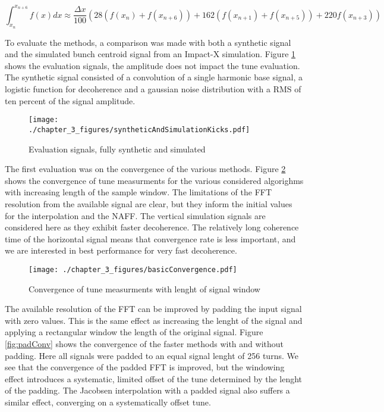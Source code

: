 \begin{equation}
	\int_{x_{n}}^{x_{n+6}}f(x)dx \approx \frac{\Delta x}{100}\left(28(f(x_n) + f(x_{n+6})) + 162(f(x_{n+1}) + f(x_{n+5})) + 220 f(x_{n+3}) \right)
	\label{eq:hardy}
\end{equation}

To evaluate the methods, a comparison was made with both a synthetic signal and the simulated bunch centroid signal from an Impact-X simulation. Figure \ref{fig:synKicks} shows the evaluation signals, the amplitude does not impact the tune evaluation. The synthetic signal consisted of a convolution of a single harmonic base signal, a logistic function for decoherence and a gaussian noise distribution with a RMS of ten percent of the signal amplitude. 

\begin{figure}
	\centering
	\texttt{[image: ./chapter\_3\_figures/syntheticAndSimulationKicks.pdf]}
	\caption{Evaluation signals, fully synthetic and simulated}
	\label{fig:synKicks}
\end{figure}

The first evaluation was on the convergence of the various methods. Figure \ref{fig:baseConv} shows the convergence of tune measurments for the various considered algorighms with increasing length of the sample window. The limitations of the FFT resolution from the available signal are clear, but they inform the initial values for the interpolation and the NAFF. The vertical simulation signals are considered here as they exhibit faster decoherence. The relatively long coherence time of the horizontal signal means that convergence rate is less important, and we are interested in best performance for very fast decoherence.

\begin{figure}
	\centering
	\texttt{[image: ./chapter\_3\_figures/basicConvergence.pdf]}
	\caption{Convergence of tune measurments with lenght of signal window}
	\label{fig:baseConv}
\end{figure}

The available resolution of the FFT can be improved by padding the input signal with zero values. This is the same effect as increasing the lenght of the signal and applying a rectangular window the length of the original signal. Figure \ref{fig:padConv} shows the convergence of the faster methods with and without padding. Here all signals were padded to an equal signal lenght of 256 turns. We see that the convergence of the padded FFT is improved, but the windowing effect introduces a systematic, limited offset of the tune determined by the lenght of the padding. The Jacobsen interpolation with a padded signal also suffers a similar effect, converging on a systematically offset tune.

